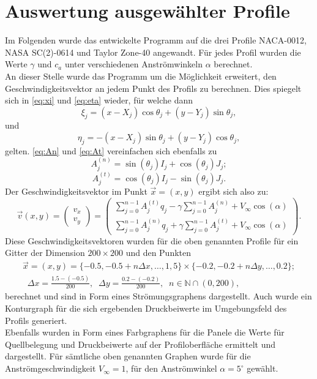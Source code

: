 \section{Auswertung ausgewählter Profile}
\label{chap:profilauswertung}
Im Folgenden wurde das entwickelte Programm auf die drei Profile NACA-0012, NASA SC(2)-0614 und Taylor Zone-40 angewandt. Für jedes Profil wurden die Werte $\gamma$ und $c_a$ unter verschiedenen Anströmwinkeln $\alpha $ berechnet. \\
An dieser Stelle wurde das Programm um die Möglichkeit erweitert, den Geschwindigkeitsvektor an jedem Punkt des Profils zu berechnen. Dies spiegelt sich in \eqref{eq:xi} und \eqref{eq:eta} wieder, für welche dann
\begin{equation}
\xi_{j} =  (x - X_j) \cos \theta _j + (y - Y_j) \sin \theta _j,
\end{equation}
und
\begin{equation}
\eta_{j} =  -(x - X_j) \sin \theta _j + (y - Y_j) \cos \theta _j,
\end{equation}
gelten. \eqref{eq:An} und \eqref{eq:At} vereinfachen sich ebenfalls zu
\begin{equation}
A_{j}^{(n)} = \sin {(\theta _j)} I_{j} + \cos{( \theta _j)} J_{j};
\end{equation}
\begin{equation}
A_{j}^{(t)} =  \cos{(\theta _j)} I_{j} - \sin{( \theta _j)} J_{j}.
\end{equation}
Der Geschwindigkeitsvektor im Punkt $\vec x = (x,y)$ ergibt sich also zu:
\begin{equation}
\vec v (x,y) = 
\begin{pmatrix}
v_x \\
v_y
\end{pmatrix}
=
\begin{pmatrix}
\sum_{j=0}^{n-1} A_{j}^{(t)} q_j - \gamma \sum_{j=0}^{n-1}A_{j}^{(n)} + V_{\infty} \cos{(\alpha)} \\
\sum_{j=0}^{n-1} A_{j}^{(n)} q_j + \gamma \sum_{j=0}^{n-1}A_{j}^{(t)} + V_{\infty} \cos{(\alpha)}
\end{pmatrix}.
\end{equation}
Diese Geschwindigkeitsvektoren wurden für die oben genannten Profile für ein Gitter der Dimension $200 \times 200$ und den Punkten
\begin{align*}
\vec x = (x,y) = \{-0.5, -0.5 + n \Delta x,\ldots, 1,5\} \times \{-0.2, -0.2 + n \Delta y, \ldots, 0.2\}; \\ \;\; \Delta x = \frac{1.5 - (-0.5)}{200}, \;\; \Delta y = \frac{0.2 - (-0.2)}{200}, \;\; n \in \mathbb{N} \cap (0,200),
\end{align*} 
berechnet und sind in Form eines Strömungsgraphens dargestellt. Auch wurde ein Konturgraph für die sich ergebenden Druckbeiwerte im Umgebungsfeld des Profils generiert. \\
Ebenfalls wurden in Form eines Farbgraphens für die Panele die Werte für Quellbelegung und Druckbeiwerte auf der Profiloberfläche ermittelt und dargestellt. Für sämtliche oben genannten Graphen wurde für die Anströmgeschwindigkeit $V_{\infty} = 1$, für den Anströmwinkel $\alpha =5^{\circ}$ gewählt.

